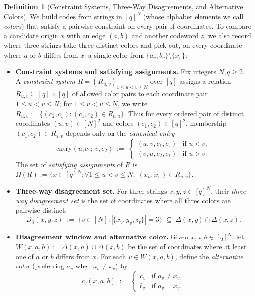 \documentclass[11pt]{article}
\theoremstyle{definition}
\newtheorem*{definition*}{Definition}
\theoremstyle{remark}
\begin{document}
\begin{definition*}[Constraint Systems, Three-Way Disagreements, and Alternative Colors]
We build codes from strings in $[q]^N$ (whose alphabet elements we call \emph{colors}) that satisfy a pairwise constraint on every pair of coordinates. To compare a candidate origin $x$ with an edge $(a, b)$ and another codeword $z$, we also record where three strings take three distinct colors and pick out, on every coordinate where $a$ or $b$ differs from $x$, a single color from $\{a_v, b_v\} \setminus \{x_v\}$:
\begin{itemize}[leftmargin=2em,nosep,topsep=4pt,itemsep=3pt]
  \item \textbf{Constraint systems and satisfying assignments.} Fix integers $N, q \ge 2$. A \emph{constraint system} $R = (R_{u, v})_{1 \le u < v \le N}$ over $[q]$ assigns a relation $R_{u, v} \subseteq [q] \times [q]$ of allowed color pairs to each coordinate pair $1 \le u < v \le N$; for $1 \le v < u \le N$, we write $R_{u, v} := \{(c_2, c_1) : (c_1, c_2) \in R_{v, u}\}$. Thus for every ordered pair of distinct coordinates $(u, v) \in [N]^2$ and colors $(c_1, c_2) \in [q]^2$, membership $(c_1, c_2) \in R_{u, v}$ depends only on the \emph{canonical entry}
  \[
  \mathrm{entry}(u, c_1;\, v, c_2) \;:=\;
  \begin{cases}
  (u, v, c_1, c_2) & \text{if } u < v, \\
  (v, u, c_2, c_1) & \text{if } u > v.
  \end{cases}
  \]
  The set of \emph{satisfying assignments} of $R$ is $\Omega(R) := \bigl\{x \in [q]^N : \forall 1 \le u < v \le N,\; (x_u, x_v) \in R_{u, v}\bigr\}$.
  \item \textbf{Three-way disagreement set.} For three strings $x, y, z \in [q]^N$, their \emph{three-way disagreement set} is the set of coordinates where all three colors are pairwise distinct:
  \[
  D_3(x, y, z) \;:=\; \bigl\{v \in [N] : |\{x_v, y_v, z_v\}| = 3\bigr\} \;\subseteq\; \Delta(x, y) \cap \Delta(x, z).
  \]
  \item \textbf{Disagreement window and alternative color.} Given $x, a, b \in [q]^N$, let $W(x, a, b) := \Delta(x, a) \cup \Delta(x, b)$ be the set of coordinates where at least one of $a$ or $b$ differs from $x$. For each $v \in W(x, a, b)$, define the \emph{alternative color} (preferring $a_v$ when $a_v \ne x_v$) by
  \[
  c_v(x, a, b) \;:=\;
  \begin{cases}
  a_v & \text{if } a_v \ne x_v, \\
  b_v & \text{if } a_v = x_v.
  \end{cases}
  \]
\end{itemize}
\end{definition*}
\end{document}
